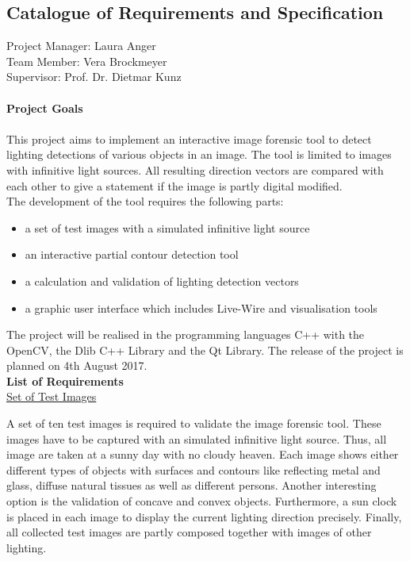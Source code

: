 \subsection{Catalogue of Requirements and Specification} \label{sec:PMcatalogue}
Project Manager: Laura Anger \\
Team Member: Vera Brockmeyer \\
Supervisor: Prof. Dr. Dietmar Kunz\\ \\
\textbf{Project Goals}\\ \\
This project aims to implement an interactive image forensic tool to detect lighting detections of various objects in an image. The tool is limited to images with infinitive light sources. All resulting direction vectors are compared with each other to give a statement if the image is partly digital modified.\\
 
The development of the tool requires the following parts: 
\begin{itemize}
\item a set of test images with a simulated infinitive light source
\item an interactive partial contour detection tool 
\item a calculation and validation of lighting detection vectors 
\item a graphic user interface which includes Live-Wire and visualisation tools
\end{itemize}

The project will be realised in the programming languages C++ with the OpenCV, the Dlib C++ Library and the Qt Library. The release of the project is planned on 4th August 2017. \\

\textbf{List of Requirements}\\

\underline{Set of Test Images}

A set of ten test images is required to validate the image forensic tool. These images have to be captured with an simulated infinitive light source. Thus, all image are taken at a sunny day with no cloudy heaven. Each image shows either different types of objects with surfaces and contours like reflecting metal and glass, diffuse natural tissues as well as different persons. Another interesting option is the validation of concave and convex objects. 
Furthermore, a sun clock is placed in each image to display the current lighting direction precisely. Finally, all collected test images are partly composed together with images of other lighting.\\


